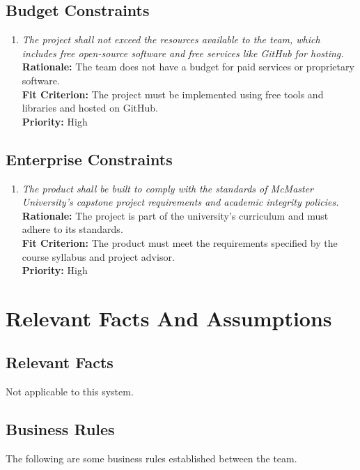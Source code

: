 \documentclass[12pt]{article}
\begin{document}
\subsection{Budget Constraints}
\begin{enumerate}[label=BDGT \arabic*., wide=0pt, leftmargin=*]
  \item \emph{The project shall not exceed the resources available to
      the team, which includes free open-source software and free
    services like GitHub for hosting.}\\[2mm]
    {\bf Rationale:} The team does not have a budget for paid
    services or proprietary software.\\
    {\bf Fit Criterion:} The project must be implemented using free
    tools and libraries and hosted on GitHub.\\
    {\bf Priority:} High
\end{enumerate}
\subsection{Enterprise Constraints}
\begin{enumerate}[label=ENTP \arabic*., wide=0pt, leftmargin=*]
  \item \emph{The product shall be built to comply with the standards
      of McMaster University’s capstone project requirements and
    academic integrity policies.}\\[2mm]
    {\bf Rationale:} The project is part of the university’s
    curriculum and must adhere to its standards.\\
    {\bf Fit Criterion:} The product must meet the requirements
    specified by the course syllabus and project advisor.\\
    {\bf Priority:} High
\end{enumerate}

\section{Relevant Facts And Assumptions}
\subsection{Relevant Facts}
Not applicable to this system.
\subsection{Business Rules}

The following are some business rules established between the team.
\end{document}

